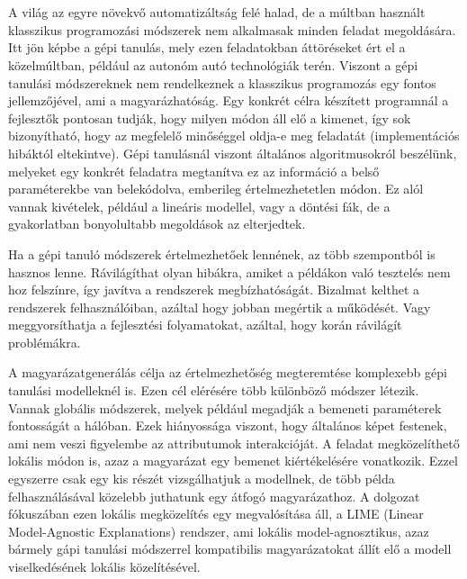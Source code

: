 \chapter{\bevezetes}

A világ az egyre növekvő automatizáltság felé halad, de a múltban használt klasszikus programozási módszerek nem alkalmasak minden feladat megoldására. Itt jön képbe a gépi tanulás, mely ezen feladatokban áttöréseket ért el a közelmúltban, például az autonóm autó technológiák terén. Viszont a gépi tanulási módszereknek nem rendelkeznek a klasszikus programozás egy fontos jellemzőjével, ami a magyarázhatóság. Egy konkrét célra készített programnál a fejlesztők pontosan tudják, hogy milyen módon áll elő a kimenet, így sok bizonyítható, hogy az megfelelő minőséggel oldja-e meg feladatát (implementációs hibáktól eltekintve). Gépi tanulásnál viszont általános algoritmusokról beszélünk, melyeket egy konkrét feladatra megtanítva ez az információ a belső paraméterekbe van belekódolva, emberileg értelmezhetetlen módon. Ez alól vannak kivételek, például a lineáris modellel, vagy a döntési fák, de a gyakorlatban bonyolultabb megoldások az elterjedtek. 
	
Ha a gépi tanuló módszerek értelmezhetőek lennének, az több szempontból is hasznos lenne. Rávilágíthat olyan hibákra, amiket a példákon való tesztelés nem hoz felszínre, így javítva a rendszerek megbízhatóságát. Bizalmat kelthet a rendszerek felhasználóiban, azáltal hogy jobban megértik a működését. Vagy meggyorsíthatja a fejlesztési folyamatokat, azáltal, hogy korán rávilágít problémákra.

A magyarázatgenerálás célja az értelmezhetőség megteremtése komplexebb gépi tanulási modelleknél is. Ezen cél elérésére több különböző módszer létezik. Vannak globális módszerek, melyek például megadják a bemeneti paraméterek fontosságát a hálóban. Ezek hiányossága viszont, hogy általános képet festenek, ami nem veszi figyelembe az attributumok interakcióját. A feladat megközelíthető lokális módon is, azaz a magyarázat egy bemenet kiértékelésére vonatkozik. Ezzel egyszerre csak egy kis részét vizsgálhatjuk a modellnek, de több példa felhasználásával közelebb juthatunk egy átfogó magyarázathoz. A dolgozat fókuszában ezen lokális megközelítés egy megvalósítása áll, a LIME (Linear Model-Agnostic Explanations) rendszer, ami lokális model-agnosztikus, azaz bármely gápi tanulási módszerrel kompatibilis magyarázatokat állít elő a modell viselkedésének lokális közelítésével.

